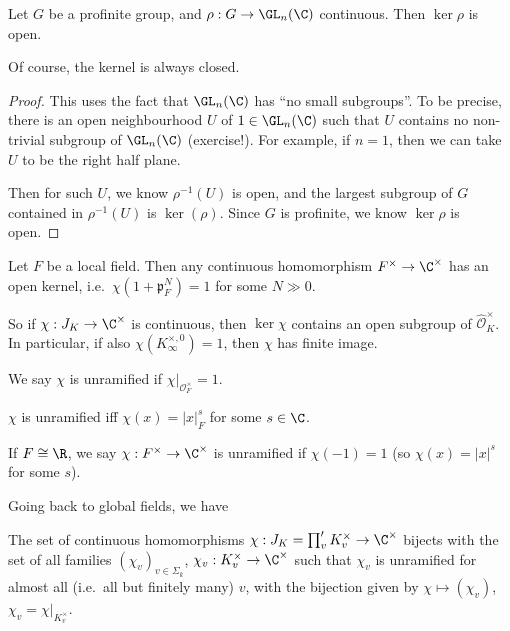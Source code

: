 \documentclass[a4paper]{article}
\begin{document}
\begin{prop}
  Let $G$ be a profinite group, and $\rho: G \to \GL_n(\C)$ continuous. Then $\ker \rho$ is open.
\end{prop}
Of course, the kernel is always closed.

\begin{proof}
  This uses the fact that $\GL_n(\C)$ has ``no small subgroups''. To be precise, there is an open neighbourhood $U$ of $1 \in \GL_n(\C)$ such that $U$ contains no non-trivial subgroup of $\GL_n(\C)$ (exercise!). For example, if $n = 1$, then we can take $U$ to be the right half plane.

  Then for such $U$, we know $\rho^{-1}(U)$ is open, and the largest subgroup of $G$ contained in $\rho^{-1}(U)$ is $\ker(\rho)$. Since $G$ is profinite, we know $\ker \rho$ is open.
\end{proof}

\begin{ex}
  Let $F$ be a local field. Then any continuous homomorphism $F^\times \to \C^\times$ has an open kernel, i.e.\ $\chi(1 + \mathfrak{p}_F^N) = 1$ for some $N \gg 0$.
\end{ex}

So if $\chi: J_K \to \C^\times$ is continuous, then $\ker \chi$ contains an open subgroup of $\hat{\mathcal{O}}_K^\times$. In particular, if also $\chi(K_\infty^{\times, 0}) = 1$, then $\chi$ has finite image.

We say $\chi$ is unramified if $\chi|_{\mathcal{O}_F^\times} = 1$.
\begin{ex}
  $\chi$ is unramified iff $\chi(x) = |x|_F^s$ for some $s \in \C$.
\end{ex}

If $F \cong \R$, we say $\chi: F^\times \to \C^\times$ is unramified if $\chi(-1) = 1$ (so $\chi(x) = |x|^s$ for some $s$).

Going back to global fields, we have
\begin{prop}
  The set of continuous homomorphisms $\chi: J_K = \prod_v' K_v^\times \to \C^\times$ bijects with the set of all families $(\chi_v)_{v \in \Sigma_k}$, $\chi_v: K_v^\times \to \C^\times$ such that $\chi_v$ is unramified for almost all (i.e.\ all but finitely many) $v$, with the bijection given by $\chi \mapsto (\chi_v)$, $\chi_v = \chi|_{K_v^\times}$.
\end{prop}
\end{document}
